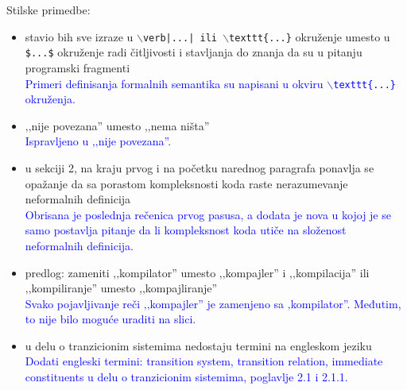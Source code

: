 \documentclass[a4paper]{report}
\newcommand{\odgovor}[1]{\textcolor{blue}{#1}}
\begin{document}
{Stilske primedbe:}
\begin{itemize}
	\item stavio bih sve izraze u {\tt $\backslash$verb|...| ili $\backslash$texttt\{...\}} okruženje umesto u {\tt \$...\$} okruženje radi čitljivosti i stavljanja do znanja da su u pitanju programski fragmenti\\
\odgovor{Primeri definisanja formalnih semantika su napisani u okviru {\tt $\backslash$texttt\{...\}} okruženja.}
	\item ‚‚nije povezana'' umesto ‚‚nema ništa''\\
	\odgovor{Ispravljeno u ‚‚nije povezana''.}
	\item u sekciji 2, na kraju prvog i na početku narednog paragrafa ponavlja se opažanje da sa porastom kompleksnosti koda raste nerazumevanje neformalnih definicija\\
	\odgovor{Obrisana je poslednja rečenica prvog pasusa, a dodata je nova u kojoj je se samo postavlja pitanje da li kompleksnost koda utiče na složenost neformalnih definicija.}
	\item predlog: zameniti ‚‚kompilator'' umesto ‚‚kompajler'' i ‚‚kompilacija'' ili ‚‚kompiliranje'' umesto ,,kompajliranje''\\
	 \odgovor{Svako pojavljivanje reči ‚‚kompajler'' je zamenjeno sa ‚kompilator''. Međutim, to nije bilo moguće uraditi na slici.}
	\item u delu o tranzicionim sistemima nedostaju termini na engleskom jeziku\\
\odgovor{Dodati engleski termini: transition system, transition relation, immediate constituents u delu o tranzicionim sistemima, poglavlje 2.1 i 2.1.1.}\\
\end{itemize}
\end{document}
